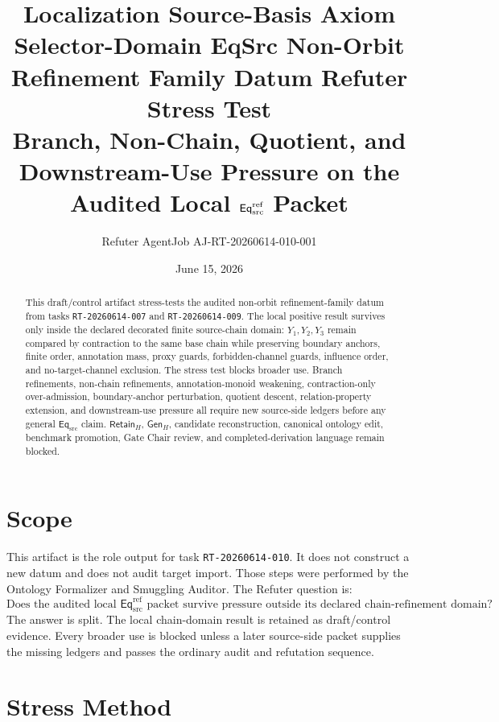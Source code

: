 \documentclass[11pt]{article}
\title{\textbf{Localization Source-Basis Axiom Selector-Domain EqSrc Non-Orbit Refinement Family Datum Refuter Stress Test}\\[0.35em]
\large Branch, Non-Chain, Quotient, and Downstream-Use Pressure on the Audited Local \(\EqRef\) Packet}
\author{Refuter AgentJob AJ-RT-20260614-010-001}
\date{June 15, 2026}
\newcommand{\EqSrc}{\mathsf{Eq}_{\mathrm{src}}}
\newcommand{\EqRef}{\mathsf{Eq}_{\mathrm{src}}^{\mathrm{ref}}}
\newcommand{\RetainH}{\mathsf{Retain}_{H}}
\newcommand{\GenH}{\mathsf{Gen}_{H}}
\begin{document}
\maketitle

\begin{abstract}
This draft/control artifact stress-tests the audited non-orbit
refinement-family datum from tasks \texttt{RT-20260614-007} and
\texttt{RT-20260614-009}. The local positive result survives only inside
the declared decorated finite source-chain domain: \(Y_{1},Y_{2},Y_{3}\)
remain compared by contraction to the same base chain while preserving
boundary anchors, finite order, annotation mass, proxy guards,
forbidden-channel guards, influence order, and no-target-channel
exclusion. The stress test blocks broader use. Branch refinements,
non-chain refinements, annotation-monoid weakening, contraction-only
over-admission, boundary-anchor perturbation, quotient descent,
relation-property extension, and downstream-use pressure all require new
source-side ledgers before any general \(\EqSrc\) claim. \(\RetainH\),
\(\GenH\), candidate reconstruction, canonical ontology edit, benchmark
promotion, Gate Chair review, and completed-derivation language remain
blocked.
\end{abstract}

\section{Scope}

This artifact is the role output for task \texttt{RT-20260614-010}. It
does not construct a new datum and does not audit target import. Those
steps were performed by the Ontology Formalizer and Smuggling Auditor.
The Refuter question is:
\[
    \text{Does the audited local }\EqRef\text{ packet survive pressure
    outside its declared chain-refinement domain?}
\]
The answer is split. The local chain-domain result is retained as
draft/control evidence. Every broader use is blocked unless a later
source-side packet supplies the missing ledgers and passes the ordinary
audit and refutation sequence.

\section{Stress Method}
\end{document}

